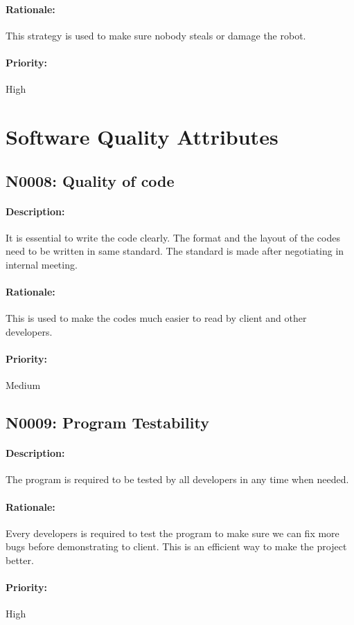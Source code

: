 \documentclass[11pt, a4paper]{report}
\begin{document}
\paragraph{Rationale:}
This strategy is used to make sure nobody steals or damage the robot.
\paragraph{Priority:}
High

\section{Software Quality Attributes}
\subsection{N0008: Quality of code}
\paragraph{Description:}
It is essential to write the code clearly. The format and the layout of the codes need to be written in same standard. The standard is made after negotiating in internal meeting.
\paragraph{Rationale:}
This is used to make the codes much easier to read by client and other developers.
\paragraph{Priority:}
Medium

\subsection{N0009: Program Testability}
\paragraph{Description:}
The program is required to be tested by all developers in any time when needed. 
\paragraph{Rationale:}
Every developers is required to test the program to make sure we can fix more bugs before demonstrating to client. This is an efficient way to make the project better.
\paragraph{Priority:}
High
\end{document}

